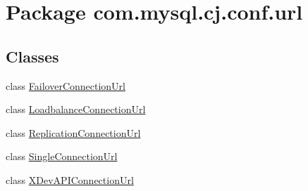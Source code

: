 \hypertarget{namespacecom_1_1mysql_1_1cj_1_1conf_1_1url}{}\section{Package com.\+mysql.\+cj.\+conf.\+url}
\label{namespacecom_1_1mysql_1_1cj_1_1conf_1_1url}
\subsection*{Classes}
\begin{DoxyCompactItemize}
\item 
class \mbox{\hyperlink{classcom_1_1mysql_1_1cj_1_1conf_1_1url_1_1_failover_connection_url}{Failover\+Connection\+Url}}
\item 
class \mbox{\hyperlink{classcom_1_1mysql_1_1cj_1_1conf_1_1url_1_1_loadbalance_connection_url}{Loadbalance\+Connection\+Url}}
\item 
class \mbox{\hyperlink{classcom_1_1mysql_1_1cj_1_1conf_1_1url_1_1_replication_connection_url}{Replication\+Connection\+Url}}
\item 
class \mbox{\hyperlink{classcom_1_1mysql_1_1cj_1_1conf_1_1url_1_1_single_connection_url}{Single\+Connection\+Url}}
\item 
class \mbox{\hyperlink{classcom_1_1mysql_1_1cj_1_1conf_1_1url_1_1_x_dev_a_p_i_connection_url}{X\+Dev\+A\+P\+I\+Connection\+Url}}
\end{DoxyCompactItemize}
